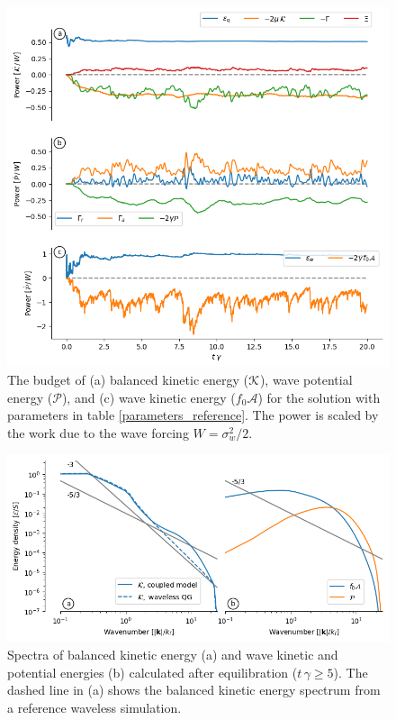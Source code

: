 \documentclass[12pt]{article}
\renewcommand{\P}{\mathcal{P}}
\newcommand{\A}{  \mathcal{A}}
\begin{document}
\begin{figure}
\centering
\includegraphics[width=.825\textwidth]{figs/K_and_P_and_A_budget_reference.png}
\caption{The budget of (a) balanced kinetic energy ($\mathcal{K}$), wave potential energy ($\P$),
        and (c) wave
         kinetic energy ($f_0 \A$)  for the solution with parameters in table
         \ref{parameters_reference}. The power is scaled by the work due to the
         wave forcing $W=\sigma_w^2/2$.}
        \label{energy_budgets_reference}
\end{figure}


\begin{figure}
\centering
\includegraphics[width=.925\textwidth]{figs/spectrum_qg-niw.png}
\caption{Spectra of balanced kinetic energy (a) and wave kinetic and potential
          energies (b) calculated after equilibration ($t\,\gamma \ge 5$). The
          dashed line in (a) shows the balanced kinetic energy spectrum from a
          reference waveless simulation.}
        \label{spectra_reference}
\end{figure}
\end{document}
